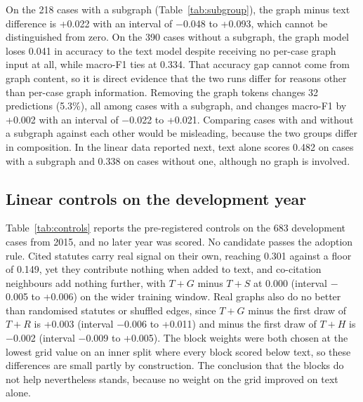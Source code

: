 \documentclass[11pt,a4paper]{article}
\begin{document}
On the 218 cases with a subgraph (Table~\ref{tab:subgroup}), the graph minus text difference is +0.022 with an interval of $-$0.048 to +0.093, which cannot be distinguished from zero. On the 390 cases without a subgraph, the graph model loses 0.041 in accuracy to the text model despite receiving no per-case graph input at all, while macro-F1 ties at 0.334. That accuracy gap cannot come from graph content, so it is direct evidence that the two runs differ for reasons other than per-case graph information. Removing the graph tokens changes 32 predictions (5.3\%), all among cases with a subgraph, and changes macro-F1 by +0.002 with an interval of $-$0.022 to +0.021. Comparing cases with and without a subgraph against each other would be misleading, because the two groups differ in composition. In the linear data reported next, text alone scores 0.482 on cases with a subgraph and 0.338 on cases without one, although no graph is involved.

\subsection{Linear controls on the development year}\label{sec:controls}
Table~\ref{tab:controls} reports the pre-registered controls on the 683 development cases from 2015, and no later year was scored. No candidate passes the adoption rule. Cited statutes carry real signal on their own, reaching 0.301 against a floor of 0.149, yet they contribute nothing when added to text, and co-citation neighbours add nothing further, with $T{+}G$ minus $T{+}S$ at 0.000 (interval $-$0.005 to +0.006) on the wider training window. Real graphs also do no better than randomised statutes or shuffled edges, since $T{+}G$ minus the first draw of $T{+}R$ is +0.003 (interval $-$0.006 to +0.011) and minus the first draw of $T{+}H$ is $-$0.002 (interval $-$0.009 to +0.005). The block weights were both chosen at the lowest grid value on an inner split where every block scored below text, so these differences are small partly by construction. The conclusion that the blocks do not help nevertheless stands, because no weight on the grid improved on text alone.
\end{document}
